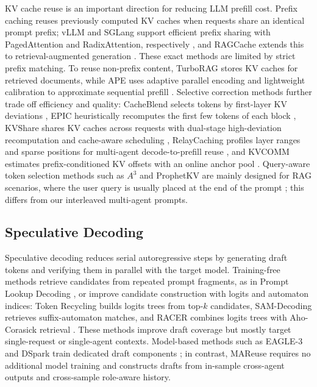 \documentclass[letterpaper]{article} %
\begin{document}
KV cache reuse is an important direction for reducing LLM prefill cost. Prefix caching reuses previously computed KV caches when requests share an identical prompt prefix; vLLM and SGLang support efficient prefix sharing with PagedAttention and RadixAttention, respectively \citep{kwon2023vllm, zheng2024sglang}, and RAGCache extends this to retrieval-augmented generation \citep{jin2025ragcache}. These exact methods are limited by strict prefix matching. To reuse non-prefix content, TurboRAG stores KV caches for retrieved documents, while APE uses adaptive parallel encoding and lightweight calibration to approximate sequential prefill \citep{lu2025turborag, yang2025ape}. Selective correction methods further trade off efficiency and quality: CacheBlend selects tokens by first-layer KV deviations \citep{yao2025cacheblend}, EPIC heuristically recomputes the first few tokens of each block \citep{hu2025epic}, KVShare shares KV caches across requests with dual-stage high-deviation recomputation and cache-aware scheduling \citep{yang2025kvshare}, RelayCaching profiles layer ranges and sparse positions for multi-agent decode-to-prefill reuse \citep{geng2026relaycaching}, and KVCOMM estimates prefix-conditioned KV offsets with an online anchor pool \citep{ye2025kvcomm}. Query-aware token selection methods such as $A^3$ and ProphetKV are mainly designed for RAG scenarios, where the user query is usually placed at the end of the prompt \citep{zhou2025a3, wang2026prophetkv}; this differs from our interleaved multi-agent prompts.

\subsection{Speculative Decoding}

Speculative decoding reduces serial autoregressive steps by generating draft tokens and verifying them in parallel with the target model. Training-free methods retrieve candidates from repeated prompt fragments, as in Prompt Lookup Decoding \citep{saxena2023promptlookup}, or improve candidate construction with logits and automaton indices: Token Recycling builds logits trees from top-$k$ candidates, SAM-Decoding retrieves suffix-automaton matches, and RACER combines logits trees with Aho-Corasick retrieval \citep{luo2025tokenrecycling, hu2025sam, zhang2026racer}. These methods improve draft coverage but mostly target single-request or single-agent contexts. Model-based methods such as EAGLE-3 and DSpark train dedicated draft components \citep{li2025eagle3, cheng2026dspark}; in contrast, MAReuse requires no additional model training and constructs drafts from in-sample cross-agent outputs and cross-sample role-aware history.
\end{document}
